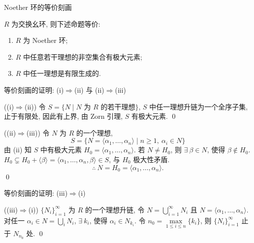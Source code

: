 
\begin{frame}{Noether 环的等价刻画}

\begin{lem}
$R$ 为交换幺环, 则下述命题等价:
\begin{enumerate}
\item[(i)] $R$ 为 Noether 环;
\item[(ii)] $R$ 中任意若干理想的非空集合有极大元素;
\item[(iii)] $R$ 中任一理想是有限生成的.
\end{enumerate}
\end{lem}

\end{frame}


\begin{frame}{等价刻画的证明: (i)$\Rightarrow$(ii) 与 (ii)$\Rightarrow$(iii)}

\startproof[bg=yellow, fg=red]((i)$\Rightarrow$(ii))
令 $S = \{ N \mid N \text{ 为 } R \text{ 的若干理想} \}$,
$S$ 中任一理想升链为一个全序子集, 止于有限处,
因此有上界, 由 Zorn 引理, $S$ 有极大元素.
\qed

\pause

\startproof[bg=yellow, fg=red]((ii)$\Rightarrow$(iii))
令 $N$ 为 $R$ 的一个理想,
\[
S = \big\{ N = \langle \alpha_1, \dots, \alpha_n \rangle \;\big|\; n \geqslant 1,\ \alpha_i \in N \big\}
\]
由 (ii) 知 $S$ 中有极大元素 $H_0 = \langle \alpha_1, \dots, \alpha_n \rangle$.
若 $N \neq H_0$, 则 $\exists\ \beta \in N$, 使得 $\beta \notin H_0$.
$H_0 \subsetneq H_0 + \langle \beta \rangle = \langle \alpha_1, \dots, \alpha_n, \beta \rangle \in S$,
与 $H_0$ 极大性矛盾.
\[
\therefore\ N = H_0 = \langle \alpha_1, \dots, \alpha_n \rangle .
\]
\qed

\end{frame}


\begin{frame}{等价刻画的证明: (iii)$\Rightarrow$(i)}

\startproof[bg=yellow, fg=red]((iii)$\Rightarrow$(i))
$\{ N_i \}_{i=1}^{\infty}$ 为 $R$ 的一个理想升链, 令
$N = \bigcup_{i=1}^{\infty} N_i$ 且 $N = \langle \alpha_1, \dots, \alpha_n \rangle$.
对任一 $\alpha_i \in N = \bigcup_i N_i$, $\exists\ k_i$, 使得 $\alpha_i \in N_{k_i}$.
令 $n_0 = \max\limits_{1 \leqslant i \leqslant n} \{ k_i \}$,
则 $\{ N_i \}_{i=1}^{\infty}$ 止于 $N_{n_0}$ 处.
\qed

\end{frame}

